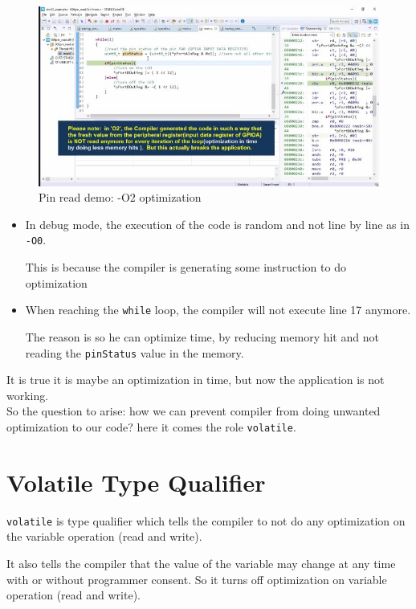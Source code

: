 \newpage
\begin{figure}[h]
\centering
\includegraphics[scale=0.7]{Figures/Embedded_C/pin_read_O2_flag}
\caption{Pin read demo: -O2 optimization}
\label{fig:Embedded_C:pin_read_O2_flag}
\end{figure} 

\begin{itemize}
    \item In debug mode, the execution of the code is random and not line by line as in \verb|-O0|. 
    
    This is because the compiler is generating some instruction to do optimization
    
    \item When reaching the \verb|while| loop, the compiler will not execute line 17 anymore.
    
    The reason is so he can optimize time, by reducing memory hit and not reading the \verb|pinStatus| value in the memory.

\end{itemize}

It is true it is maybe an optimization in time, but now the application is not working.\\

So the question to arise: how we can prevent compiler from doing unwanted optimization to our code? here it comes the role \verb|volatile|.

\newpage
\section{Volatile Type Qualifier}

\verb|volatile| is type qualifier which tells the compiler to not do any optimization on the variable operation (read and write).

It also tells the compiler that the value of the variable may change at any time with or without programmer consent. So it turns off optimization on variable operation (read and write).\\

